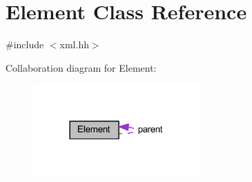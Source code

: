\hypertarget{class_element}{}\section{Element Class Reference}
\label{class_element}


{\ttfamily \#include $<$xml.\+hh$>$}



Collaboration diagram for Element\+:
\nopagebreak
\begin{figure}[H]
\begin{center}
\leavevmode
\includegraphics[width=182pt]{class_element__coll__graph}
\end{center}
\end{figure}
